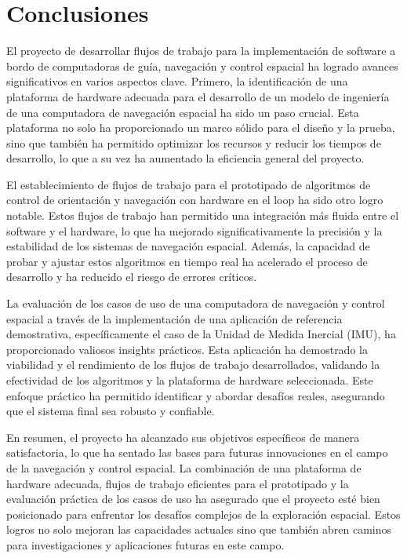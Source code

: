 \chapter{Conclusiones}

El proyecto de desarrollar flujos de trabajo para la implementación de software a bordo de computadoras de guía, navegación y control espacial ha logrado avances significativos en varios aspectos clave. Primero, la identificación de una plataforma de hardware adecuada para el desarrollo de un modelo de ingeniería de una computadora de navegación espacial ha sido un paso crucial. Esta plataforma no solo ha proporcionado un marco sólido para el diseño y la prueba, sino que también ha permitido optimizar los recursos y reducir los tiempos de desarrollo, lo que a su vez ha aumentado la eficiencia general del proyecto.

El establecimiento de flujos de trabajo para el prototipado de algoritmos de control de orientación y navegación con hardware en el loop ha sido otro logro notable. Estos flujos de trabajo han permitido una integración más fluida entre el software y el hardware, lo que ha mejorado significativamente la precisión y la estabilidad de los sistemas de navegación espacial. Además, la capacidad de probar y ajustar estos algoritmos en tiempo real ha acelerado el proceso de desarrollo y ha reducido el riesgo de errores críticos.

La evaluación de los casos de uso de una computadora de navegación y control espacial a través de la implementación de una aplicación de referencia demostrativa, específicamente el caso de la Unidad de Medida Inercial (IMU), ha proporcionado valiosos insights prácticos. Esta aplicación ha demostrado la viabilidad y el rendimiento de los flujos de trabajo desarrollados, validando la efectividad de los algoritmos y la plataforma de hardware seleccionada. Este enfoque práctico ha permitido identificar y abordar desafíos reales, asegurando que el sistema final sea robusto y confiable.

En resumen, el proyecto ha alcanzado sus objetivos específicos de manera satisfactoria, lo que ha sentado las bases para futuras innovaciones en el campo de la navegación y control espacial. La combinación de una plataforma de hardware adecuada, flujos de trabajo eficientes para el prototipado y la evaluación práctica de los casos de uso ha asegurado que el proyecto esté bien posicionado para enfrentar los desafíos complejos de la exploración espacial. Estos logros no solo mejoran las capacidades actuales sino que también abren caminos para investigaciones y aplicaciones futuras en este campo.
